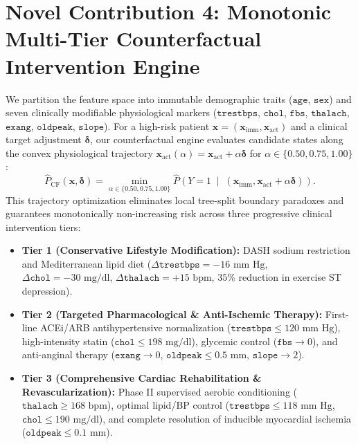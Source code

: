 \documentclass[12pt,a4paper]{report}
\begin{document}
\section{Novel Contribution 4: Monotonic Multi-Tier Counterfactual Intervention Engine}
We partition the feature space into immutable demographic traits ($\texttt{age}$, $\texttt{sex}$) and seven clinically modifiable physiological markers ($\texttt{trestbps}$, $\texttt{chol}$, $\texttt{fbs}$, $\texttt{thalach}$, $\texttt{exang}$, $\texttt{oldpeak}$, $\texttt{slope}$). For a high-risk patient $\bm{x} = (\bm{x}_{\text{imm}}, \bm{x}_{\text{act}})$ and a clinical target adjustment $\bm{\delta}$, our counterfactual engine evaluates candidate states along the convex physiological trajectory $\bm{x}_{\text{act}}(\alpha) = \bm{x}_{\text{act}} + \alpha \bm{\delta}$ for $\alpha \in \{0.50, 0.75, 1.00\}$:
\begin{equation}
    \hat{P}_{\text{CF}}(\bm{x}, \bm{\delta}) = \min_{\alpha \in \{0.50, 0.75, 1.00\}} \hat{P}\left(Y=1 \;\middle|\; \left(\bm{x}_{\text{imm}}, \bm{x}_{\text{act}} + \alpha \bm{\delta}\right)\right).
\end{equation}
This trajectory optimization eliminates local tree-split boundary paradoxes and guarantees monotonically non-increasing risk across three progressive clinical intervention tiers:
\begin{itemize}
    \item \textbf{Tier 1 (Conservative Lifestyle Modification):} DASH sodium restriction and Mediterranean lipid diet ($\Delta \texttt{trestbps} = -16\text{ mm Hg}$, $\Delta \texttt{chol} = -30\text{ mg/dl}$, $\Delta \texttt{thalach} = +15\text{ bpm}$, $35\%$ reduction in exercise ST depression).
    \item \textbf{Tier 2 (Targeted Pharmacological \& Anti-Ischemic Therapy):} First-line ACEi/ARB antihypertensive normalization ($\texttt{trestbps} \le 120\text{ mm Hg}$), high-intensity statin ($\texttt{chol} \le 198\text{ mg/dl}$), glycemic control ($\texttt{fbs} \to 0$), and anti-anginal therapy ($\texttt{exang} \to 0$, $\texttt{oldpeak} \le 0.5\text{ mm}$, $\texttt{slope} \to 2$).
    \item \textbf{Tier 3 (Comprehensive Cardiac Rehabilitation \& Revascularization):} Phase II supervised aerobic conditioning ($\texttt{thalach} \ge 168\text{ bpm}$), optimal lipid/BP control ($\texttt{trestbps} \le 118\text{ mm Hg}$, $\texttt{chol} \le 190\text{ mg/dl}$), and complete resolution of inducible myocardial ischemia ($\texttt{oldpeak} \le 0.1\text{ mm}$).
\end{itemize}
\end{document}
